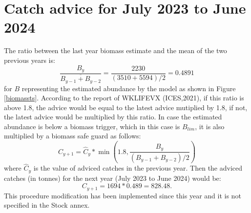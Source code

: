 \documentclass[review]{elsarticle}
\begin{document}
\section{Catch advice for July 2023 to June 2024}
The ratio between the last year biomass estimate and the mean of the two previous years is: $$\frac{B_{y}}{\overline{B_{y-1}+B_{y-2}}}=\frac{2230}{(3510+5594)/2}=0.4891$$ for  $B$ representing the estimated abundance by the model as shown in Figure \ref{biomassts}. According to the report of WKLIFEVX (ICES,2021), if this ratio is above 1.8, the advice would be equal to the latest advice mutiplied by 1.8, if not,  the latest advice would be multiplied by this ratio. In case the estimated abundance is below a biomass trigger, which in this case is $B_{lim}$, it is also multiplied by a biomass safe guard as follows:  $$C_{y+1}=\hat{C}_{y}*\min\left(1.8,\frac{B_{y}}{(B_{y-1}+B_{y-2})/2}\right)$$ where  $\hat{C}_{y}$ is the value of adviced catches in the previous year. Then the adviced catches (in tonnes) for the next year (July 2023 to June 2024) would be: $$C_{y+1}=1694*0.489=828.48.$$  This procedure modification has been implemented since this year and it is not specified in the Stock annex.







\end{document}
